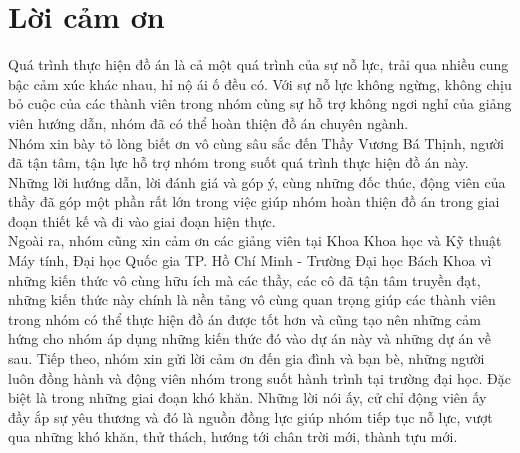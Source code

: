 \section*{Lời cảm ơn}
\thispagestyle{empty}
\hspace*{0.5cm} Quá trình thực hiện đồ án là cả một quá trình của sự nỗ lực, trải qua nhiều cung bậc cảm xúc khác nhau, hỉ nộ ái ố đều có. Với sự nỗ lực không ngừng, không chịu bỏ cuộc của các thành viên trong nhóm cùng sự hỗ trợ không ngơi nghỉ của giảng viên hướng dẫn, nhóm đã có thể hoàn thiện đồ án chuyên ngành.\\
\hspace*{0.5cm} Nhóm xin bày tỏ lòng biết ơn vô cùng sâu sắc đến Thầy Vương Bá Thịnh, người đã tận tâm, tận lực hỗ trợ nhóm trong suốt quá trình thực hiện đồ án này. Những lời hướng dẫn, lời đánh giá và góp ý, cùng những đốc thúc, động viên của thầy đã góp một phần rất lớn trong việc giúp nhóm hoàn thiện đồ án trong giai đoạn thiết kế và đi vào giai đoạn hiện thực.\\
\hspace*{0.5cm} Ngoài ra, nhóm cũng xin cảm ơn các giảng viên tại Khoa Khoa học và Kỹ thuật Máy tính, Đại học Quốc gia TP. Hồ Chí Minh - Trường Đại học Bách Khoa vì những kiến thức vô cùng hữu ích mà các thầy, các cô đã tận tâm truyền đạt, những kiến thức này chính là nền tảng vô cùng quan trọng giúp các thành viên trong nhóm có thể thực hiện đồ án được tốt hơn và cũng tạo nên những cảm hứng cho nhóm áp dụng những kiến thức
đó vào dự án này và những dự án về sau.
Tiếp theo, nhóm xin gửi lời cảm ơn đến gia đình và bạn bè, những người luôn đồng hành và động viên nhóm trong suốt hành trình tại trường đại học. Đặc biệt là trong những giai đoạn khó khăn. Những lời nói ấy, cử chỉ động viên ấy đầy ắp sự yêu thương và đó là nguồn đồng lực giúp nhóm tiếp tục nỗ lực, vượt qua những khó khăn, thử thách, hướng tới chân trời mới, thành tựu mới.
 


\clearpage
{}
